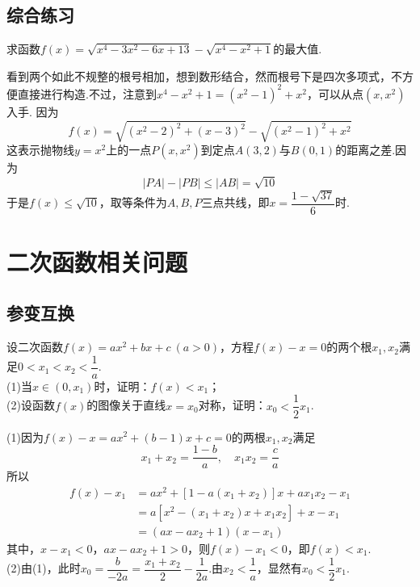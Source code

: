 \documentclass[cn,hazy,black,10pt,normal]{elegantnote}
\newenvironment{guess}{
  \color{guess}}{\newline \color{black}}
\begin{document}
\subsection{综合练习}

\begin{problem} %
	求函数$f(x)=\sqrt{x^4-3x^2-6x+13} - \sqrt{x^4 - x^2 + 1}$的最大值.
\end{problem}
\begin{solution}
	\begin{guess}
		看到两个如此不规整的根号相加，想到数形结合，然而根号下是四次多项式，不方便直接进行构造.不过，注意到$x^4-x^2+1 = (x^2-1)^2 + x^2$，可以从点$(x,x^2)$入手.
	\end{guess}
	因为$$f(x) = \sqrt{(x^2-2)^2 + (x-3)^2} - \sqrt{(x^2-1)^2 + x^2}$$
	这表示抛物线$y=x^2$上的一点$P(x,x^2)$到定点$A(3,2)$与$B(0,1)$的距离之差.因为$$|PA| - |PB| \leq |AB| = \sqrt{10}$$
	于是$f(x) \leq \sqrt{10}$，取等条件为$A,B,P$三点共线，即$x=\dfrac{1-\sqrt{37}}{6}$时.
\end{solution}

\section{二次函数相关问题}

\subsection{参变互换}

\begin{problem} %
	设二次函数$f(x)=ax^2+bx+c~(a>0)$，方程$f(x)-x=0$的两个根$x_1,x_2$满足$0<x_1<x_2< \dfrac{1}{a}$. \\
	(1)当$x \in (0,x_1)$时，证明：$f(x)<x_1$； \\
	(2)设函数$f(x)$的图像关于直线$x=x_0$对称，证明：$x_0 < \dfrac{1}{2}x_1$.
\end{problem}
\begin{solution}
	(1)因为$f(x)-x=ax^2+(b-1)x+c=0$的两根$x_1,x_2$满足$$x_1+x_2=\frac{1-b}{a},\quad x_1x_2=\frac{c}{a}$$
	所以
	\begin{align*}
		f(x)-x_1 &= ax^2 + [1-a(x_1+x_2)]x+ax_1x_2-x_1 \\
		&= a[x^2-(x_1+x_2)x+x_1x_2]+x-x_1 \\
		&= (ax-ax_2+1)(x-x_1)
	\end{align*}
	其中，$x-x_1<0$，$ax-ax_2+1>0$，则$f(x)-x_1<0$，即$f(x)<x_1$. \\
	(2)由(1)，此时$x_0 = \dfrac{b}{-2a} = \dfrac{x_1+x_2}{2}-\dfrac{1}{2a}$.由$x_2 < \dfrac{1}{a}$，显然有$x_0<\dfrac{1}{2}x_1$.
\end{solution}
\end{document}

